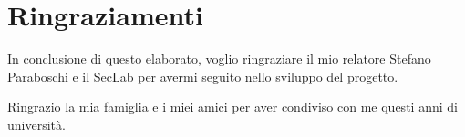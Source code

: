 \chapter*{Ringraziamenti}
In conclusione di questo elaborato, voglio ringraziare il mio relatore Stefano Paraboschi e il SecLab per avermi seguito nello sviluppo del progetto.

Ringrazio la mia famiglia e i miei amici per aver condiviso con me questi anni di università.